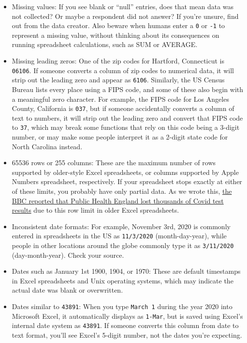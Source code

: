 \documentclass[
  english,
]{book}
\providecommand{\tightlist}{%
  \setlength{\itemsep}{0pt}\setlength{\parskip}{0pt}}
\begin{document}
\begin{itemize}
\tightlist
\item
  Missing values: If you see blank or ``null'' entries, does that mean data was not collected? Or maybe a respondent did not answer? If you're unsure, find out from the data creator. Also beware when humans enter a \texttt{0} or \texttt{-1} to represent a missing value, without thinking about its consequences on running spreadsheet calculations, such as SUM or AVERAGE.
\item
  Missing leading zeros: One of the zip codes for Hartford, Connecticut is \texttt{06106}. If someone converts a column of zip codes to numerical data, it will strip out the leading zero and appear as \texttt{6106}. Similarly, the US Census Bureau lists every place using a FIPS code, and some of these also begin with a meaningful zero character. For example, the FIPS code for Los Angeles County, California is \texttt{037}, but if someone accidentally converts a column of text to numbers, it will strip out the leading zero and convert that FIPS code to \texttt{37}, which may break some functions that rely on this code being a 3-digit number, or may make some people interpret it as a 2-digit state code for North Carolina instead.
\item
  65536 rows or 255 columns: These are the maximum number of rows supported by older-style Excel spreadsheets, or columns supported by Apple Numbers spreadsheet, respectively. If your spreadsheet stops exactly at either of these limits, you probably have only partial data. As we wrote this, \href{https://www.bbc.com/news/technology-54423988}{the BBC reported that Public Health England lost thousands of Covid test results} due to this row limit in older Excel spreadsheets.
\item
  Inconsistent date formats: For example, November 3rd, 2020 is commonly entered in spreadsheets in the US as \texttt{11/3/2020} (month-day-year), while people in other locations around the globe commonly type it as \texttt{3/11/2020} (day-month-year). Check your source.
\item
  Dates such as January 1st 1900, 1904, or 1970: These are default timestamps in Excel spreadsheets and Unix operating systems, which may indicate the actual date was blank or overwritten.
\item
  Dates similar to \texttt{43891}: When you type \texttt{March\ 1} during the year 2020 into Microsoft Excel, it automatically displays as \texttt{1-Mar}, but is saved using Excel's internal date system as \texttt{43891}. If someone converts this column from date to text format, you'll see Excel's 5-digit number, not the dates you're expecting.
\end{itemize}
\end{document}
